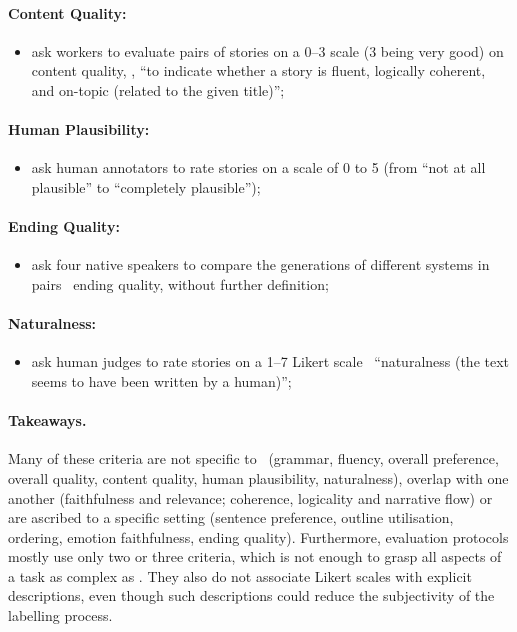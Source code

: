 \paragraph{Content Quality:}
\begin{itemize}[nolistsep]
    \item \citet{brahman2020modeling} ask workers to evaluate pairs of stories on a 0--3 scale (3 being very good) on content quality, \ie, ``to indicate whether a story is fluent, logically coherent, and on-topic (related to the given title)'';
\end{itemize}

\paragraph{Human Plausibility:}
\begin{itemize}[nolistsep]
    \item \citet{ghazarian-etal-2021-plot} ask human annotators to rate stories on a scale of 0 to 5 (from ``not at all plausible'' to ``completely plausible'');
\end{itemize}

\paragraph{Ending Quality:}
\begin{itemize}[nolistsep]
    \item \citet{bai2021semantics} ask four native speakers to compare the generations of different systems in pairs \wrt\ ending quality, without further definition;
\end{itemize}

\paragraph{Naturalness:}
\begin{itemize}[nolistsep]
    \item \citet{pascual-etal-2021-plug-play} ask human judges to rate stories on a 1--7 Likert scale \wrt\ ``naturalness (the text seems to have been written by a human)'';
\end{itemize}

\paragraph{Takeaways.}
Many of these criteria are not specific to \asgfull\ (grammar, fluency, overall preference, overall quality, content quality, human plausibility, naturalness), overlap with one another (faithfulness and relevance; coherence, logicality and narrative flow) or are ascribed to a specific setting (sentence preference, outline utilisation, ordering, emotion faithfulness, ending quality). Furthermore, evaluation protocols mostly use only two or three criteria, which is not enough to grasp all aspects of a task as complex as \asg. They also do not associate Likert scales with explicit descriptions, even though such descriptions could reduce the subjectivity of the labelling process.

